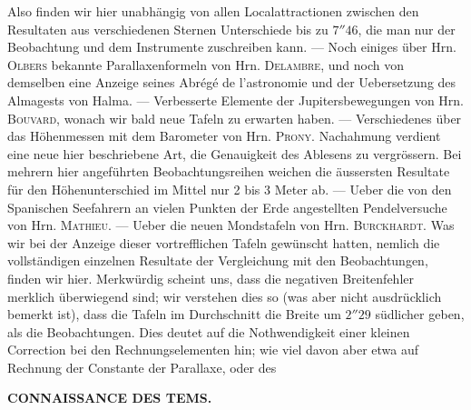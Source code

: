 Also finden wir hier unabhängig von allen Localattractionen zwischen den Resultaten aus verschiedenen Sternen Unterschiede bis zu $7''46$, die man nur der Beobachtung und dem Instrumente zuschreiben kann. --- Noch einiges über Hrn. \textsc{Olbers} bekannte Parallaxenformeln von Hrn. \textsc{Delambre}, und noch von demselben eine Anzeige seines Abrégé de l'astronomie und der Uebersetzung des Almagests von Halma. --- Verbesserte Elemente der Jupitersbewegungen von Hrn. \textsc{Bouvard}, wonach wir bald neue Tafeln zu erwarten haben. --- Verschiedenes über das Höhenmessen mit dem Barometer von Hrn. \textsc{Prony}. Nachahmung verdient eine neue hier beschriebene Art, die Genauigkeit des Ablesens zu vergrössern. Bei mehrern hier angeführten Beobachtungsreihen weichen die äussersten Resultate für den Höhenunterschied im Mittel nur 2 bis 3 Meter ab. --- Ueber die von den Spanischen Seefahrern an vielen Punkten der Erde angestellten Pendelversuche von Hrn. \textsc{Mathieu}. --- Ueber die neuen Mondstafeln von Hrn. \textsc{Burckhardt}. Was wir bei der Anzeige dieser vortrefflichen Tafeln gewünscht hatten, nemlich die vollständigen einzelnen Resultate der Vergleichung mit den Beobachtungen, finden wir hier. Merkwürdig scheint uns, dass die negativen Breitenfehler merklich überwiegend sind; wir verstehen dies so (was aber nicht ausdrücklich bemerkt ist), dass die Tafeln im Durchschnitt die Breite um $2''29$ südlicher geben, als die Beobachtungen. Dies deutet auf die Nothwendigkeit einer kleinen Correction bei den Rechnungselementen hin; wie viel davon aber etwa auf Rechnung der Constante der Parallaxe, oder des
\par
\clearpage
\thispagestyle{empty}
\noindent{}%
\makebox[12mm][l]{}%
\parbox[t]{\dimexpr\linewidth-24mm\relax}{\centering\footnotesize\bfseries CONNAISSANCE DES TEMS.}%
\par\nobreak\medskip
